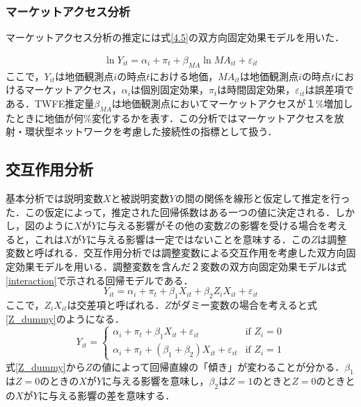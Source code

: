 \subsubsection{マーケットアクセス分析}
マーケットアクセス分析の推定には式\ref{4.5}の双方向固定効果モデルを用いた．

\begin{eqnarray}
  \ln{Y_{it}}= \alpha_{i} + \pi_{t} + \beta_{MA}\ln{{MA}_{it}}+ \varepsilon_{it}
    \label{4.5}
\end{eqnarray}  
ここで，$Y_{it}$は地価観測点$i$の時点$t$における地価，$MA_{it}$は地価観測点$i$の時点$t$におけるマーケットアクセス，$\alpha_{i}$は個別固定効果，$\pi_{t}$は時間固定効果，$\varepsilon_{it}$は誤差項である．TWFE推定量$\beta_{MA}$は地価観測点においてマーケットアクセスが１\%増加したときに地価が何\%変化するかを表す．この分析ではマーケットアクセスを放射・環状型ネットワークを考慮した接続性の指標として扱う．




\subsection{交互作用分析}
基本分析では説明変数$X$と被説明変数$Y$の間の関係を線形と仮定して推定を行った．この仮定によって，推定された回帰係数はある一つの値に決定される．しかし，図のように$X$が$Y$に与える影響がその他の変数$Z$の影響を受ける場合を考えると，これは$X$が$Y$に与える影響は一定ではないことを意味する．この$Z$は調整変数と呼ばれる．交互作用分析では調整変数による交互作用を考慮した双方向固定効果モデルを用いる．調整変数を含んだ２変数の双方向固定効果モデルは式\ref{interaction}で示される回帰モデルである．
\begin{equation}
  Y_{it} = \alpha_{i} + \pi_{t} + \beta_{1}X_{it} + \beta_{2}Z_{i}X_{it} + \varepsilon_{it}
  \label{interaction}
\end{equation}
ここで，$Z_{i}X_{it}$は交差項と呼ばれる．$Z$がダミー変数の場合を考えると式\ref{Z_dummy}のようになる．
\begin{equation}
  Y_{it} =
  \begin{cases}
    \alpha_{i} + \pi_{t} + \beta_{1}X_{it}  + \varepsilon_{it} & \text{if } Z_{i} = 0 \\
    \alpha_{i} + \pi_{t} + (\beta_{1}+\beta_{2})X_{it} + \varepsilon_{it} & \text{if } Z_{i} = 1
  \end{cases}
  \label{Z_dummy}
\end{equation}
式\ref{Z_dummy}から$Z$の値によって回帰直線の「傾き」が変わることが分かる．$\beta_{1}$は$Z=0$のときの$X$が$Y$に与える影響を意味し，$\beta_{2}$は$Z=1$のときと$Z=0$のときとの$X$が$Y$に与える影響の差を意味する．

